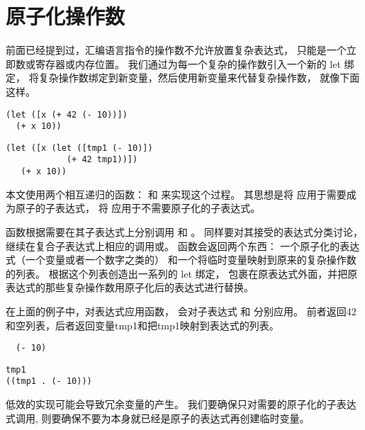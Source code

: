 
\section{原子化操作数}

前面已经提到过，汇编语言指令的操作数不允许放置复杂表达式，
只能是一个立即数或寄存器或内存位置。
我们通过为每一个复杂的操作数引入一个新的 let 绑定，
将复杂操作数绑定到新变量，然后使用新变量来代替复杂操作数，
就像下面这样。

\begin{transformation}
\begin{lstlisting}
(let ([x (+ 42 (- 10))])
  (+ x 10))
\end{lstlisting}
\compilesto
\begin{lstlisting}
(let ([x (let ([tmp1 (- 10)])
            (+ 42 tmp1))])
   (+ x 10))
\end{lstlisting}
\end{transformation}

本文使用两个相互递归的函数： 和  来实现这个过程。
其思想是将  应用于需要成为原子的子表达式，
将  应用于不需要原子化的子表达式。

 函数根据需要在其子表达式上分别调用
 和 。
同样要对其接受的表达式分类讨论，
继续在复合子表达式上相应的调用或。
 函数会返回两个东西：
一个原子化的表达式（一个变量或者一个数字之类的）
和一个将临时变量映射到原来的复杂操作数的列表。
 根据这个列表创造出一系列的 let 绑定，
包裹在原表达式外面，并把原表达式的那些复杂操作数用原子化后的表达式进行替换。

在上面的例子中，对表达式应用函数，
会对子表达式  和  分别应用。
前者返回42和空列表，后者返回变量tmp1和把tmp1映射到表达式的列表。

\begin{transformation}
\begin{lstlisting}
  (- 10)
\end{lstlisting}
\compilesto
\begin{lstlisting}
tmp1
((tmp1 . (- 10)))
\end{lstlisting}
\end{transformation}

低效的实现可能会导致冗余变量的产生。
我们要确保只对需要的原子化的子表达式调用,
则要确保不要为本身就已经是原子的表达式再创建临时变量。

